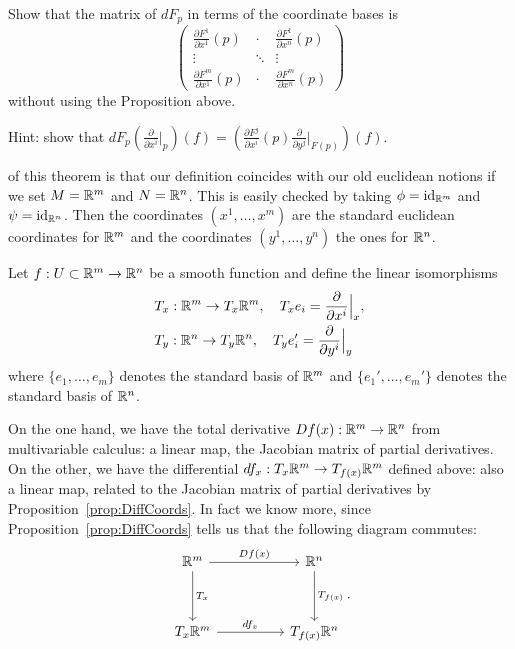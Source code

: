\begin{exercise}
  Show that the matrix of $d F_p$ in terms of the coordinate bases is 
  \begin{equation}
    \begin{pmatrix}
      \frac{\partial F^1}{\partial x^1} (p) & \cdot & \frac{\partial F^1}{\partial x^n} (p) \\
      \vdots & \ddots & \vdots \\
      \frac{\partial F^m}{\partial x^1} (p) & \cdot & \frac{\partial F^m}{\partial x^n} (p)
    \end{pmatrix}
  \end{equation}
  without using the Proposition above.

  \noindent Hint: show that $d F_p \left(\frac{\partial}{\partial x^i}\big|_p\right) (f) = \left(\frac{\partial F^j}{\partial x^i} (p) \frac{\partial}{\partial y^j}\big|_{F(p)}\right) (f)$.
\end{exercise}

 of this theorem is that our definition coincides with our old euclidean notions if we set $M=\mathbb{R}^m$ and $N=\mathbb{R}^n$.
This is easily checked by taking $\phi = \operatorname{id}_{\mathbb{R}^m}$ and $\psi=\operatorname{id}_{\mathbb{R}^n}$.
Then the coordinates $(x^1,\ldots,x^m)$ are the standard euclidean coordinates for $\mathbb{R}^m$ and the coordinates $(y^1,\ldots,y^n)$ the ones for $\mathbb{R}^n$.

Let $f:U\subset\mathbb{R}^m\to\mathbb{R}^n$ be a smooth function and define the linear isomorphisms
\begin{align}\label{def:lin_iso_Tp}
  &T_x : \mathbb{R}^m \to T_x\mathbb{R}^m,\quad T_x e_i = \frac{\partial}{\partial x^i}\Big|_x,\\
  &T_y : \mathbb{R}^n \to T_y\mathbb{R}^n,\quad T_y e_i' = \frac{\partial}{\partial y^i}\Big|_y
\end{align}
where $\{e_1,\ldots,e_m\}$ denotes the standard basis of $\mathbb{R}^m$ and $\{e_1',\ldots,e_m'\}$ denotes the standard basis of $\mathbb{R}^n$.

On the one hand, we have the total derivative $Df(x):\mathbb{R}^m\to\mathbb{R}^n$ from multivariable calculus: a linear map, the Jacobian matrix of partial derivatives.
On the other, we have the differential $df_x : T_x \mathbb{R}^m \to T_{f(x)}\mathbb{R}^m$ defined above: also a linear map, related to the Jacobian matrix of partial derivatives by Proposition~\ref{prop:DiffCoords}.
In fact we know more, since Proposition~\ref{prop:DiffCoords} tells us that the following diagram commutes:
\begin{equation}
  \begin{tikzcd}[row sep=huge, column sep=huge]
    \R^m \arrow[r, "Df(x)"] \arrow[d, "T_x"]
    & \R^n \arrow[d, "T_{f(x)}"] \\
    T_x\R^m \arrow[r, "df_x"]
    & T_{f(x)}\R^n
  \end{tikzcd}.
\end{equation}

